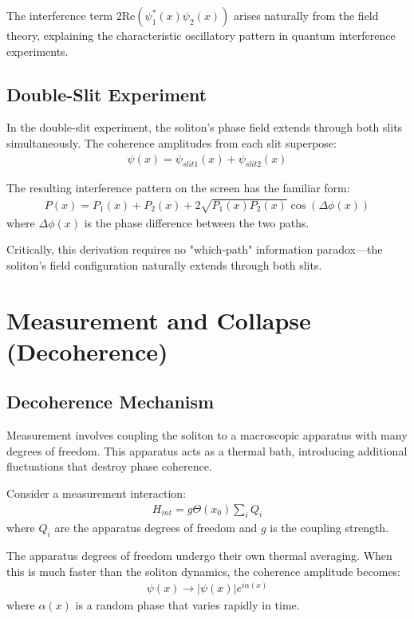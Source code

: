 ﻿\documentclass[twocolumn,showpacs,preprintnumbers,amsmath,amssymb,prd]{revtex4-2}
\begin{document}
The interference term $2\text{Re}(\psi_1^*(x)\psi_2(x))$ arises naturally from the field theory, explaining the characteristic oscillatory pattern in quantum interference experiments.

\subsection{Double-Slit Experiment}

In the double-slit experiment, the soliton's phase field extends through both slits simultaneously. The coherence amplitudes from each slit superpose:
\begin{align}
\psi(x) = \psi_{slit1}(x) + \psi_{slit2}(x)
\end{align}

The resulting interference pattern on the screen has the familiar form:
\begin{align}
P(x) = P_1(x) + P_2(x) + 2\sqrt{P_1(x)P_2(x)}\cos(\Delta\phi(x))
\end{align}
where $\Delta\phi(x)$ is the phase difference between the two paths.

Critically, this derivation requires no "which-path" information paradox---the soliton's field configuration naturally extends through both slits.

\section{Measurement and Collapse (Decoherence)}

\subsection{Decoherence Mechanism}

Measurement involves coupling the soliton to a macroscopic apparatus with many degrees of freedom. This apparatus acts as a thermal bath, introducing additional fluctuations that destroy phase coherence.

Consider a measurement interaction:
\begin{align}
H_{int} = g\Theta(x_0) \sum_{i} Q_i
\end{align}
where $Q_i$ are the apparatus degrees of freedom and $g$ is the coupling strength.

The apparatus degrees of freedom undergo their own thermal averaging. When this is much faster than the soliton dynamics, the coherence amplitude becomes:
\begin{align}
\psi(x) \to |\psi(x)| e^{i\alpha(x)}
\end{align}
where $\alpha(x)$ is a random phase that varies rapidly in time.
\end{document}
